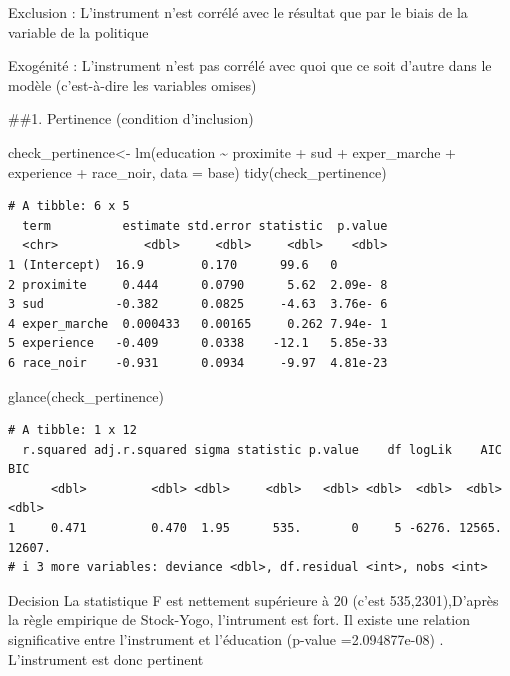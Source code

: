 \documentclass[
  letterpaper,
  DIV=11,
  numbers=noendperiod]{scrartcl}
\newenvironment{Shaded}{\begin{snugshade}}{\end{snugshade}}
\newcommand{\AttributeTok}[1]{\textcolor[rgb]{0.40,0.45,0.13}{#1}}
\newcommand{\FunctionTok}[1]{\textcolor[rgb]{0.28,0.35,0.67}{#1}}
\newcommand{\NormalTok}[1]{\textcolor[rgb]{0.00,0.23,0.31}{#1}}
\newcommand{\OtherTok}[1]{\textcolor[rgb]{0.00,0.23,0.31}{#1}}
\newcommand{\SpecialCharTok}[1]{\textcolor[rgb]{0.37,0.37,0.37}{#1}}
\begin{document}
Exclusion : L'instrument n'est corrélé avec le résultat que par le biais
de la variable de la politique

Exogénité : L'instrument n'est pas corrélé avec quoi que ce soit d'autre
dans le modèle (c'est-à-dire les variables omises)

\#\#1. Pertinence (condition d'inclusion)

\begin{Shaded}
\begin{Highlighting}[]
\NormalTok{check\_pertinence}\OtherTok{\textless{}{-}} \FunctionTok{lm}\NormalTok{(education }\SpecialCharTok{\textasciitilde{}}\NormalTok{ proximite }\SpecialCharTok{+}\NormalTok{ sud  }\SpecialCharTok{+}\NormalTok{ exper\_marche }\SpecialCharTok{+}\NormalTok{ experience }\SpecialCharTok{+}\NormalTok{ race\_noir,}
                      \AttributeTok{data =}\NormalTok{ base)}
\FunctionTok{tidy}\NormalTok{(check\_pertinence)}
\end{Highlighting}
\end{Shaded}

\begin{verbatim}
# A tibble: 6 x 5
  term          estimate std.error statistic  p.value
  <chr>            <dbl>     <dbl>     <dbl>    <dbl>
1 (Intercept)  16.9        0.170      99.6   0       
2 proximite     0.444      0.0790      5.62  2.09e- 8
3 sud          -0.382      0.0825     -4.63  3.76e- 6
4 exper_marche  0.000433   0.00165     0.262 7.94e- 1
5 experience   -0.409      0.0338    -12.1   5.85e-33
6 race_noir    -0.931      0.0934     -9.97  4.81e-23
\end{verbatim}

\begin{Shaded}
\begin{Highlighting}[]
\FunctionTok{glance}\NormalTok{(check\_pertinence)}
\end{Highlighting}
\end{Shaded}

\begin{verbatim}
# A tibble: 1 x 12
  r.squared adj.r.squared sigma statistic p.value    df logLik    AIC    BIC
      <dbl>         <dbl> <dbl>     <dbl>   <dbl> <dbl>  <dbl>  <dbl>  <dbl>
1     0.471         0.470  1.95      535.       0     5 -6276. 12565. 12607.
# i 3 more variables: deviance <dbl>, df.residual <int>, nobs <int>
\end{verbatim}

Decision La statistique F est nettement supérieure à 20 (c'est
535,2301),D'après la règle empirique de Stock-Yogo, l'intrument est
fort. Il existe une relation significative entre l'instrument et
l'éducation (p-value =2.094877e-08) . L'instrument est donc pertinent
\end{document}
